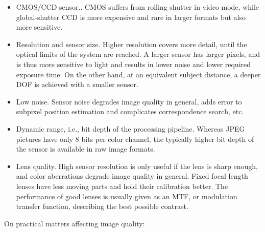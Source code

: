 \begin{itemize}
	\item CMOS/CCD sensor..
		CMOS suffers from rolling shutter in video mode, while global-shutter CCD is more expensive and rare in larger formats but also more sensitive.

	\item Resolution and sensor size.
		Higher resolution covers more detail, until the optical limits of the system are reached.
		A larger sensor has larger pixels, and is thus more sensitive to light and results in lower noise and lower required exposure time.
		On the other hand, at an equivalent subject distance, a deeper DOF is achieved with a smaller sensor.

	\item Low noise.
		Sensor noise degrades image quality in general, adds error to subpixel position estimation and complicates correspondence search, etc.

	\item Dynamic range, i.e., bit depth of the processing pipeline.
		Whereas JPEG pictures have only 8 bits per color channel, the typically higher bit depth of the sensor is available in raw image formats.  %

	\item Lens quality.
		High sensor resolution is only useful if the lens is sharp enough, and color aberrations degrade image quality in general.
		Fixed focal length lenses have less moving parts and hold their calibration better.
		The performance of good lenses is usually given as an MTF, or modulation transfer function, describing the best possible contrast.
\end{itemize}

On practical matters affecting image quality:

